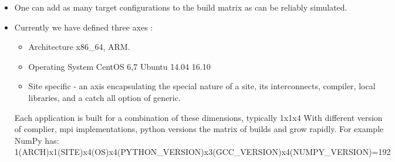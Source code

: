 \documentclass[17pt, a0paper, landscape, margin=0mm, innermargin=15mm,
     blockverticalspace=5mm, colspace=5mm, subcolspace=8mm]{tikzposter} %
\begin{document}
\begin{columns}
{             \begin{itemize}
                 \item One can add as many target configurations to the build matrix as can be reliably simulated.
                 \item Currently we have defined three axes :
                 \begin{itemize}
                    \item Architecture x86\_64, ARM.
                    \item Operating System CentOS 6,7  Ubuntu 14.04 16.10
                    \item Site specific - an axis encapsulating the special nature of a site, its interconnects, compiler, local libraries, and a catch all option of generic.
                 \end{itemize} 
                     Each application is built for a combination of these dimensions, typically 1x1x4
                     With different version of complier, mpi implementations, python versions the matrix of builds and grow rapidly. 
                     For example NumPy has:\\
                     1(ARCH)x1(SITE)x4(OS)x4(PYTHON\_VERSION)x3(GCC\_VERSION)x4(NUMPY\_VERSION)=192
             \end{itemize}
        }


\end{columns}
\end{document}
